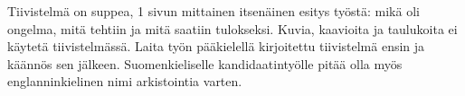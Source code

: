 Tiivistelmä on suppea, 1 sivun mittainen itsenäinen esitys työstä: mikä oli ongelma, mitä tehtiin ja mitä saatiin tulokseksi. Kuvia, kaavioita ja taulukoita ei käytetä tiivistelmässä. Laita työn pääkielellä kirjoitettu tiivistelmä ensin ja käännös sen jälkeen. Suomenkieliselle kandidaatintyölle pitää olla myös englanninkielinen nimi arkistointia varten.